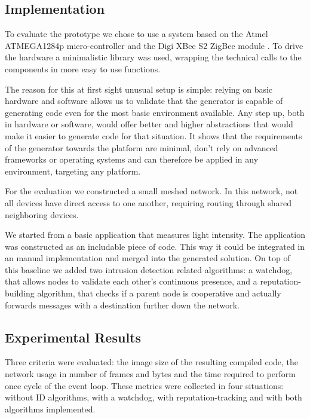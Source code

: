 \documentclass[conference]{IEEEtran}
\begin{document}
\subsection*{Implementation}

To evaluate the prototype we chose to use a system based on the Atmel
ATMEGA1284p micro-controller \cite{datasheet:atmega1284p} and the Digi XBee S2
ZigBee module \cite{manual:xbee}. To drive the hardware a minimalistic library
was used, wrapping the technical calls to the components in more easy to use
functions.

The reason for this at first sight unusual setup is simple: relying on basic
hardware and software allows us to validate that the generator is capable of
generating code even for the most basic environment available. Any step up,
both in hardware or software, would offer better and higher abstractions that
would make it easier to generate code for that situation. It shows that the
requirements of the generator towards the platform are minimal, don't rely on
advanced frameworks or operating systems and can therefore be applied in any
environment, targeting any platform.

For the evaluation we constructed a small meshed network. In this network, not
all devices have direct access to one another, requiring routing through shared
neighboring devices.

We started from a basic application that measures light intensity. The
application was constructed as an includable piece of code. This way it could
be integrated in an manual implementation and merged into the generated
solution. On top of this baseline we added two intrusion detection related
algorithms: a watchdog\cite{mishra2004intrusion}, that allows nodes to validate
each other's continuous presence, and a reputation-building
algorithm\cite{ganeriwal2008reputation}, that checks if a parent node is
cooperative and actually forwards messages with a destination further down the
network.

\subsection*{Experimental Results}

Three criteria were evaluated: the image size of the resulting compiled code,
the network usage in number of frames and bytes and the time required to
perform once cycle of the event loop. These metrics were collected in four
situations: without ID algorithms, with a watchdog, with reputation-tracking
and with both algorithms implemented.
\end{document}
